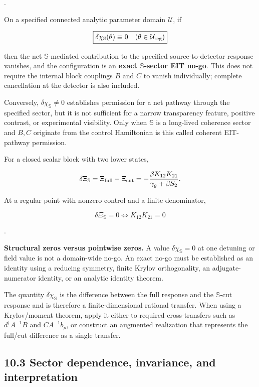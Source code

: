 \documentclass[
  10pt,
  a4paper,
]{article}
\begin{document}
.

On a specified connected analytic parameter domain \(\mathcal U\), if

\[
\boxed{
\delta\chi_{\mathbb S}(\theta)\equiv0
\quad(\theta\in\mathcal U_{\rm reg})
}
\]

then the net \(\mathbb S\)-mediated contribution to the specified
source-to-detector response vanishes, and the configuration is an
\textbf{exact \(\mathbb S\)-sector EIT no-go}. This does not require the
internal block couplings \(B\) and \(C\) to vanish individually;
complete cancellation at the detector is also included.

Conversely, \(\delta\chi_{\mathbb S}\neq0\) establishes permission for a
net pathway through the specified sector, but it is not sufficient for a
narrow transparency feature, positive contrast, or experimental
visibility. Only when \(\mathbb S\) is a long-lived coherence sector and
\(B,C\) originate from the control Hamiltonian is this called coherent
EIT-pathway permission.

For a closed scalar block with two lower states,

\[
\delta\Xi_{\mathbb S}
=\Xi_{\rm full}-\Xi_{\rm cut}
=-\frac{\beta K_{12}K_{21}}
{\gamma_g+\beta S_2}.
\]

At a regular point with nonzero control and a finite denominator,

\[
\boxed{
\delta\Xi_{\mathbb S}=0
\Longleftrightarrow
K_{12}K_{21}=0
}
\]

.

\textbf{Structural zeros versus pointwise zeros.} A value
\(\delta\chi_{\mathbb S}=0\) at one detuning or field value is not a
domain-wide no-go. An exact no-go must be established as an identity
using a reducing symmetry, finite Krylov orthogonality, an
adjugate-numerator identity, or an analytic identity theorem.

The quantity \(\delta\chi_{\mathbb S}\) is the difference between the
full response and the \(\mathbb S\)-cut response and is therefore a
finite-dimensional rational transfer. When using a Krylov/moment
theorem, apply it either to required cross-transfers such as
\(d^\dagger A^{-1}B\) and \(CA^{-1}b_p\), or construct an augmented
realization that represents the full/cut difference as a single
transfer.

\subsection{10.3 Sector dependence, invariance, and
interpretation}\label{sector-dependence-invariance-and-interpretation}
\end{document}
